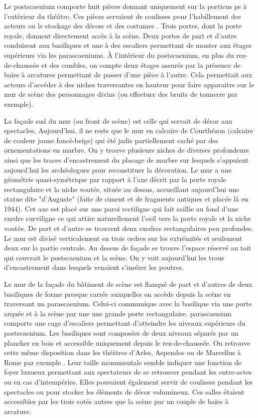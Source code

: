 		Le \gls{postscaenium} comporte huit pièces donnant uniquement sur la \gls{porticus ps} à l'extérieur du théâtre. Ces pièces servaient de coulisses pour l'habillement des acteurs ou le stockage des décors et des costumes \cite[p. 56]{formige}. Trois portes, dont la porte royale, donnent directement accès à la scène. Deux portes de part et d'autre conduisent aux \glspl{basilique} et une à des escaliers permettant de monter aux étages supérieurs via les \glspl{parascaenium}. \`{A} l'intérieur du \gls{postscaenium}, en plus du rez-de-chaussée et des combles, on compte deux étages assurés par la présence de baies à arcatures permettant de passer d'une pièce à l'autre. Cela permettait aux acteurs d'accéder à des niches traversantes en hauteur pour faire apparaitre sur le mur de scène des personnages divins (ou effectuer des bruits de tonnerre par exemple).
		
		La façade sud du mur (ou front de scène) est celle qui servait de décor aux spectacles. Aujourd'hui, il ne reste que le mur en calcaire de Courthézon (calcaire de couleur jaune foncé-beige) qui été jadis partiellement caché par des ornementations en marbre. On y trouve plusieurs niches de diverses profondeurs ainsi que les traces d'encastrement du placage de marbre sur lesquels s'appuient aujourd'hui les archéologues pour reconstituer la décoration. Le mur a une géométrie quasi-symétrique par rapport à l'axe décrit par la porte royale rectangulaire et la niche voutée, située au dessus, accueillant aujourd'hui une statue dite "d'Auguste" (faite de ciment et de fragments antiques et placée là en 1944). Cet axe est placé sur une paroi rectiligne qui fait saillie au fond d'une \gls{exedre} curviligne ce qui attire naturellement l'oeil vers la porte royale et la niche voutée. De part et d'autre se trouvent deux \glspl{exedre} rectangulaires peu profondes. Le mur est divisé verticalement en trois ordres sur les extrémités et seulement deux sur la partie centrale. Au dessus de façade se trouve l'espace réservé au toit qui couvrait le \gls{postscaenium} et la scène. On y voit aujourd'hui les trous d'encastrement dans lesquels venaient s'insérer les poutres.
		
		Le mur de la façade du bâtiment de scène est flanqué de part et d'autres de deux \glspl{basilique} de forme presque carrée auxquelles on accède depuis la scène en traversant un \gls{parascaenium}. Celui-ci communique avec la basilique via une porte arquée et à la scène par une une grande porte rectangulaire. \gls{parascaenium} comporte une cage d'escaliers permettant d'atteindre les niveaux supérieurs du \gls{postscaenium}. Les \glspl{basilique} sont composées de deux niveaux séparés par un plancher en bois et accessible uniquement depuis le rez-de-chaussée. On retrouve cette même disposition dans les théâtres d'Arles, Aspendos ou de Marcellus à Rome par exemple \cite[p. 35]{formige}. Leur taille monumentale semble indiquer une fonction de foyer luxueux permettant aux spectateurs de se retrouver pendant les entre-actes ou en cas d'intempéries. Elles pouvaient également servir de coulisses pendant les spectacles ou pour stocker les éléments de décor volumineux. Ces salles étaient accessibles par les trois cotés autres que la scène par un couple de baies à arcature. 
				
